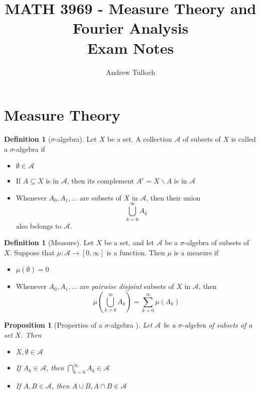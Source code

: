 \documentclass[10pt, oneside, reqno]{amsart}
\title{MATH 3969 - Measure Theory and Fourier Analysis \\ Exam Notes}								%
\author{Andrew Tulloch}
\theoremstyle{plain}%
\newtheorem{prop}[thm]{Proposition}
\theoremstyle{definition}
\newtheorem{defn}[thm]{Definition}
\theoremstyle{remark}
\begin{document}
\maketitle
 
\section{Measure Theory}
\newcommand{\sig}{$\sigma$-algebra }
\newcommand{\siga}{\mathcal{A}}

\begin{defn}[$\sigma$-algebra]
	Let $X$ be a set.  A collection $\mathcal{A}$ of subsets of $X$ is called a \sig if 
	\begin{itemize}
		\item $\emptyset \in \siga$ 
		\item If $A \subseteq X$ is in $\siga$, then its complement $A^c = X \backslash A$ is in $\siga$
		\item Whenever $A_0,A_1,\dots$ are subsets of $X$ in $\siga$, then their union\[
			\bigcup_{k=0}^\infty A_k
		\] also belongs to $\siga$.
	\end{itemize}
\end{defn}

\begin{defn}[Measure]
	Let $X$ be a set, and let $\siga$ be a \sig of subsets of $X$.   Suppose that $\mu: \siga \rightarrow [0,\infty]$ is a function.  Then $\mu$ is a measure if 
	\begin{itemize}
		\item $\mu(\emptyset) = 0$
		\item Whenever $A_0, A_1,\dots$ are \emph{pairwise disjoint} subsets of $X$ in $\siga$, then \[
			\mu(\bigcup_{k=0}^\infty A_k) = \sum_{k=0}^\infty \mu(A_k)
		\]
	\end{itemize}
\end{defn}

\begin{prop}[Properties of a \sig] Let $\siga$ be a \sig of subsets of a set $X$.  Then
	\begin{itemize}
		\item $X, \emptyset \in \siga$
		\item If $A_k \in \siga$, then $\bigcap_{k=0}^\infty A_k \in \siga$
		\item If $A,B \in \siga$, then $A \cup B, A \cap B \in \siga$
	\end{itemize}
	
\end{prop}
\end{document}
